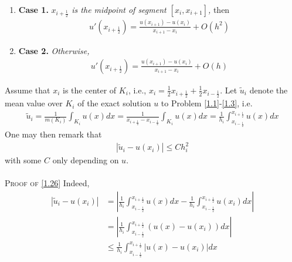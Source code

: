 \documentclass[a4paper]{article}
\numberwithin{equation}{section}
\begin{document}
\begin{enumerate}
\item \textbf{Case 1.} \textit{$x_{i+\frac{1}{2}}$ is the midpoint of segment $\left[x_i,x_{i+1}\right]$,} then
\begin{align}
u'\left( {{x_{i + \frac{1}{2}}}} \right) = \frac{{u\left( {{x_{i + 1}}} \right) - u\left( {{x_i}} \right)}}{{{x_{i + 1}} - {x_i}}} + O\left( {{h^2}} \right)
\end{align}
\item \textbf{Case 2.} \textit{Otherwise,}
\begin{align}
u'\left( {{x_{i + \frac{1}{2}}}} \right) = \frac{{u\left( {{x_{i + 1}}} \right) - u\left( {{x_i}} \right)}}{{{x_{i + 1}} - {x_i}}} + O\left( h \right)
\end{align}
\end{enumerate}

Assume that $x_i$ is the center of $K_i$, i.e., ${x_i} = \frac{1}{2}{x_{i + \frac{1}{2}}} + \frac{1}{2}{x_{i - \frac{1}{2}}}$. Let $\widetilde{u}_i$ denote the mean value over $K_i$ of the exact solution $u$ to Problem \eqref{1.1}-\eqref{1.3}, i.e.
\begin{align}
{\widetilde u_i} = \frac{1}{{m\left( {{K_i}} \right)}}\int_{{K_i}} {u\left( x \right)dx}  = \frac{1}{{{x_{i + \frac{1}{2}}} - {x_{i - \frac{1}{2}}}}}\int_{{K_i}} {u\left( x \right)dx}  = \frac{1}{{{h_i}}}\int_{{x_{i - \frac{1}{2}}}}^{{x_{i + \frac{1}{2}}}} {u\left( x \right)dx} 
\end{align}
One may then remark that 
\begin{align}
\label{1.26}
\left| {{{\widetilde u}_i} - u\left( {{x_i}} \right)} \right| \le Ch_i^2
\end{align}
with some $C$ only depending on $u$.\\
\\
\textsc{Proof of \eqref{1.26}} Indeed,
\begin{align}
\left| {{{\widetilde u}_i} - u\left( {{x_i}} \right)} \right| &= \left| {\frac{1}{h_i}\int_{{x_{i - \frac{1}{2}}}}^{{x_{i + \frac{1}{2}}}} {u\left( x \right)dx}  - \frac{1}{h_i}\int_{{x_{i - \frac{1}{2}}}}^{{x_{i + \frac{1}{2}}}} {u\left( {{x_i}} \right)dx} } \right|\\
& = \left| {\frac{1}{h_i}\int_{{x_{i - \frac{1}{2}}}}^{{x_{i + \frac{1}{2}}}} {\left( {u\left( x \right) - u\left( {{x_i}} \right)} \right)dx} } \right|\\
& \le \frac{1}{h_i}\int_{{x_{i - \frac{1}{2}}}}^{{x_{i + \frac{1}{2}}}} {\left| {u\left( x \right) - u\left( {{x_i}} \right)} \right|dx} \label{1.29}
\end{align}
\end{document}
